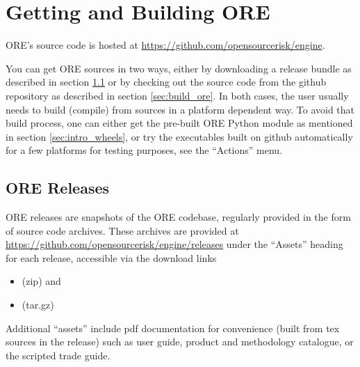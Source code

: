 \section{Getting and Building ORE}\label{sec:installation}

ORE's source code is hosted at \url{https://github.com/opensourcerisk/engine}.

You can get ORE sources in two ways, either by downloading a release bundle as described in section \ref{sec:release}
or by checking out the source code from the github repository as described in section \ref{sec:build_ore}.
In both cases, the user usually needs to build (compile) from sources in a platform dependent way.
To avoid that build process, one can either get the pre-built ORE Python module as mentioned in section \ref{sec:intro_wheels},
or try the executables built on github automatically for a few platforms for testing purposes, see the ``Actions'' menu.

\subsection{ORE Releases}\label{sec:release}

ORE releases are snapshots of the ORE codebase, regularly provided in the form of source code archives.
These archives are provided at \url{https://github.com/opensourcerisk/engine/releases} under the ``Assets'' heading
for each release, accessible via the download links
\begin{itemize}
\item {\color{blue}{\bf Source code} (zip)} and
\item {\color{blue}{\bf Source code} (tar.gz)}
\end{itemize}
Additional ``assets'' include pdf documentation for convenience (built from tex sources in the release) such as user guide,
product and methodology catalogue, or the scripted trade guide.

